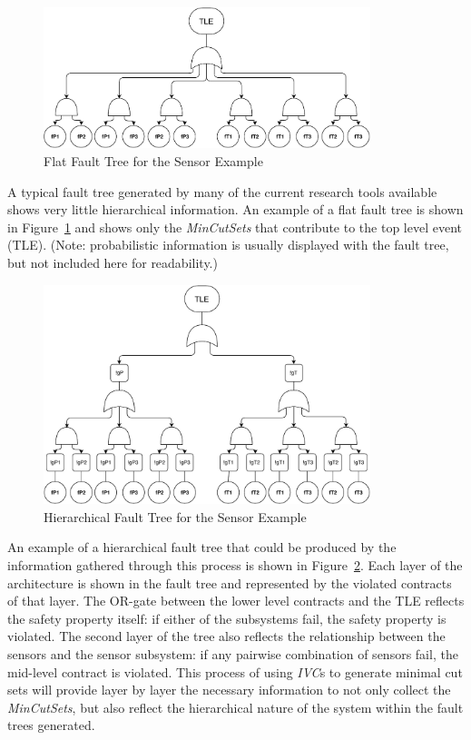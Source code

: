 \begin{figure}[h!]
	\centering
	\includegraphics[trim=0 0 0 0,clip,width=0.85\textwidth]{images/flatFT.pdf}
	\caption{Flat Fault Tree for the Sensor Example}
	\label{fig:flatFT}
\end{figure}
\newpage
A typical fault tree generated by many of the current research tools available shows very little hierarchical information. An example of a flat fault tree is shown in Figure~\ref{fig:flatFT} and shows only the \textit{MinCutSets} that contribute to the top level event (TLE). (Note: probabilistic information is usually displayed with the fault tree, but not included here for readability.)

\begin{figure}[h!]
	\centering
	\includegraphics[trim=0 0 0 0,clip,width=0.85\textwidth]{images/ftSensor.pdf}
	\caption{Hierarchical Fault Tree for the Sensor Example}
	\label{fig:ftSensor}
\end{figure}

An example of a hierarchical fault tree that could be produced by the information gathered through this process is shown in Figure~\ref{fig:ftSensor}. Each layer of the architecture is shown in the fault tree and represented by the violated contracts of that layer. The OR-gate between the lower level contracts and the TLE reflects the safety property itself: if either of the subsystems fail, the safety property is violated. The second layer of the tree also reflects the relationship between the sensors and the sensor subsystem: if any pairwise combination of sensors fail, the mid-level contract is violated. This process of using \textit{IVC}s to generate minimal cut sets will provide layer by layer the necessary information to not only collect the \textit{MinCutSets}, but also reflect the hierarchical nature of the system within the fault trees generated.

